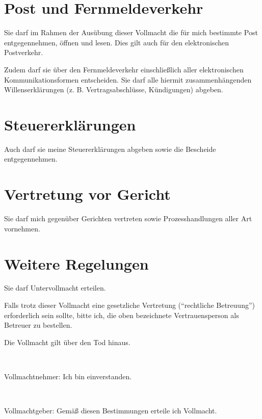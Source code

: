 \documentclass[pdftex,12pt,a4paper]{article}
\begin{document}
\section{Post und Fernmeldeverkehr}

Sie darf im Rahmen der Ausübung dieser Vollmacht die für mich bestimmte Post
entgegennehmen, öffnen und lesen. Dies gilt auch für den elektronischen Postverkehr.

Zudem darf sie über den Fernmeldeverkehr einschließlich aller elektronischen
Kommunikationsformen entscheiden. Sie darf alle hiermit zusammenhängenden
Willenserklärungen (z. B. Vertragsabschlüsse, Kündigungen) abgeben. 

\section{Steuererklärungen}

Auch darf sie meine Steuererklärungen abgeben sowie die Bescheide 
entgegennehmen.

\section{Vertretung vor Gericht} 

Sie darf mich gegenüber Gerichten vertreten sowie Prozesshandlungen aller Art
vornehmen. 

\section{Weitere Regelungen}

Sie darf Untervollmacht erteilen. 

Falls trotz dieser Vollmacht eine gesetzliche Vertretung (\enquote{rechtliche Betreuung}) erforderlich
sein sollte, bitte ich, die oben bezeichnete Vertrauensperson als Betreuer zu bestellen. 

Die Vollmacht gilt über den Tod hinaus. 





~

Vollmachtnehmer: Ich bin einverstanden.

\mytrustedone

\signaturefield

~

Vollmachtgeber: Gemäß diesen Bestimmungen erteile ich Vollmacht.

\myfullname

\signaturefield
\end{document}
